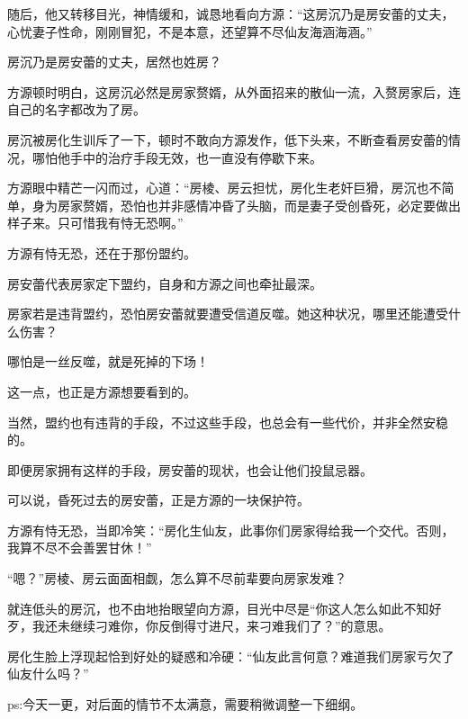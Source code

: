 \begin{this_body}
随后，他又转移目光，神情缓和，诚恳地看向方源：“这房沉乃是房安蕾的丈夫，心忧妻子性命，刚刚冒犯，不是本意，还望算不尽仙友海涵海涵。”

房沉乃是房安蕾的丈夫，居然也姓房？

方源顿时明白，这房沉必然是房家赘婿，从外面招来的散仙一流，入赘房家后，连自己的名字都改为了房。

房沉被房化生训斥了一下，顿时不敢向方源发作，低下头来，不断查看房安蕾的情况，哪怕他手中的治疗手段无效，也一直没有停歇下来。

方源眼中精芒一闪而过，心道：“房棱、房云担忧，房化生老奸巨猾，房沉也不简单，身为房家赘婿，恐怕也并非感情冲昏了头脑，而是妻子受创昏死，必定要做出样子来。只可惜我有恃无恐啊。”

方源有恃无恐，还在于那份盟约。

房安蕾代表房家定下盟约，自身和方源之间也牵扯最深。

房家若是违背盟约，恐怕房安蕾就要遭受信道反噬。她这种状况，哪里还能遭受什么伤害？

哪怕是一丝反噬，就是死掉的下场！

这一点，也正是方源想要看到的。

当然，盟约也有违背的手段，不过这些手段，也总会有一些代价，并非全然安稳的。

即便房家拥有这样的手段，房安蕾的现状，也会让他们投鼠忌器。

可以说，昏死过去的房安蕾，正是方源的一块保护符。

方源有恃无恐，当即冷笑：“房化生仙友，此事你们房家得给我一个交代。否则，我算不尽不会善罢甘休！”

“嗯？”房棱、房云面面相觑，怎么算不尽前辈要向房家发难？

就连低头的房沉，也不由地抬眼望向方源，目光中尽是“你这人怎么如此不知好歹，我还未继续刁难你，你反倒得寸进尺，来刁难我们了？”的意思。

房化生脸上浮现起恰到好处的疑惑和冷硬：“仙友此言何意？难道我们房家亏欠了仙友什么吗？”

ps:今天一更，对后面的情节不太满意，需要稍微调整一下细纲。

\end{this_body}

